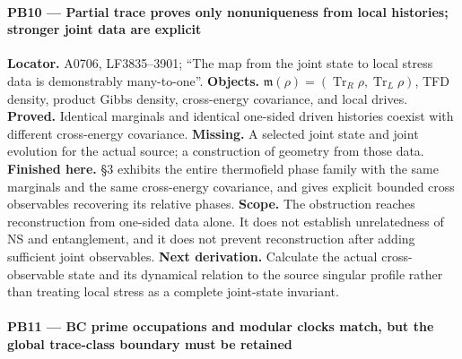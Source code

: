\paragraph{PB10 --- Partial trace proves only nonuniqueness from local
histories; stronger joint data are
explicit}\label{TranscriptLedgerStage:pb10-partial-trace-proves-only-nonuniqueness-from-local-histories-stronger-joint-data-are-explicit}

\textbf{Locator.} A0706, LF3835--3901; ``The map from the joint state to
local stress data is demonstrably many-to-one''. \textbf{Objects.}
\(\mathfrak m(\rho)=(\operatorname{Tr}_R\rho,\operatorname{Tr}_L\rho)\),
TFD density, product Gibbs density, cross-energy covariance, and local
drives. \textbf{Proved.} Identical marginals and identical one-sided
driven histories coexist with different cross-energy covariance.
\textbf{Missing.} A selected joint state and joint evolution for the
actual source; a construction of geometry from those data.
\textbf{Finished here.} \protect{} §3 exhibits the
entire thermofield phase family with the same marginals and the same
cross-energy covariance, and gives explicit bounded cross observables
recovering its relative phases. \textbf{Scope.} The obstruction reaches
reconstruction from one-sided data alone. It does not establish
unrelatedness of NS and entanglement, and it does not prevent
reconstruction after adding sufficient joint observables. \textbf{Next
derivation.} Calculate the actual cross-observable state and its
dynamical relation to the source singular profile rather than treating
local stress as a complete joint-state invariant.

\paragraph{PB11 --- BC prime occupations and modular clocks match, but
the global trace-class boundary must be
retained}\label{TranscriptLedgerStage:pb11-bc-prime-occupations-and-modular-clocks-match-but-the-global-trace-class-boundary-must-be-retained}


